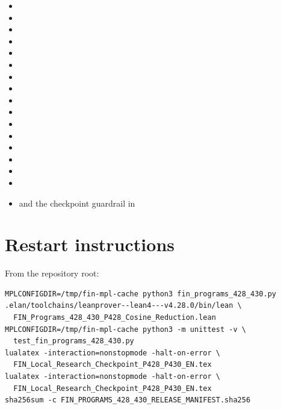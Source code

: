 \documentclass[11pt,a4paper]{article}
\begin{document}
\begin{itemize}
\item {}
\item {}
\item {}
\item {}
\item {}
\item {}
\item {}
\item {}
\item {}
\item {}
\item {}
\item {}
\item {}
\item {}
\item {}
\item {}
\item {} and the checkpoint guardrail in 
\end{itemize}

\section{Restart instructions}

From the repository root:
\begin{verbatim}
MPLCONFIGDIR=/tmp/fin-mpl-cache python3 fin_programs_428_430.py
.elan/toolchains/leanprover--lean4---v4.28.0/bin/lean \
  FIN_Programs_428_430_P428_Cosine_Reduction.lean
MPLCONFIGDIR=/tmp/fin-mpl-cache python3 -m unittest -v \
  test_fin_programs_428_430.py
lualatex -interaction=nonstopmode -halt-on-error \
  FIN_Local_Research_Checkpoint_P428_P430_EN.tex
lualatex -interaction=nonstopmode -halt-on-error \
  FIN_Local_Research_Checkpoint_P428_P430_EN.tex
sha256sum -c FIN_PROGRAMS_428_430_RELEASE_MANIFEST.sha256
\end{verbatim}
\end{document}
